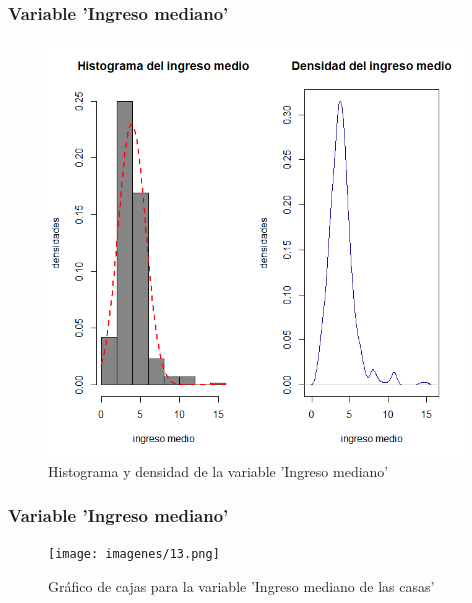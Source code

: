 \documentclass[12pt]{beamer}
\begin{document}
\begin{frame}
\frametitle{Variable 'Ingreso mediano'}
\begin{figure}[!h]
    \begin{center}
        \includegraphics[width=11cm]{imagenes/2.png}
        \caption{Histograma y densidad de la variable 'Ingreso mediano'}
        \label{fig:Densidad}
    \end{center}
\end{figure}
\end{frame}
\begin{frame}
\frametitle{Variable 'Ingreso mediano'}
\begin{figure}[!h]
    \begin{center}
        \texttt{[image: imagenes/13.png]}
        \caption{Gráfico de cajas para la variable 'Ingreso mediano de las casas'}
        \label{fig:Densidad}
    \end{center}
\end{figure}
\end{frame}
\end{document}
